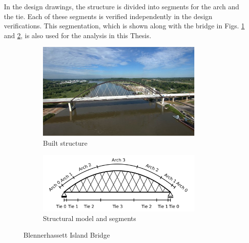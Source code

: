 In the design drawings, the structure is divided into segments for the arch and the tie. Each of these segments is verified independently in the design verifications. This segmentation, which is shown along with the bridge in Figs. \ref{fig:Blennerhassett2_a} and \ref{fig:fig:Blennerhassett2_b}, is also used for the analysis in this Thesis.


\begin{figure}[H]
\centering
\begin{subfigure}{0.5\textwidth}
    \centering
    \includegraphics[width=0.9\textwidth]{overleaf/Pictures/Blennerhassett_2.jpg}
    \caption{Built structure}
    \label{fig:Blennerhassett2_a}
\end{subfigure}%
\begin{subfigure}{.5\textwidth}
    \centering
    \vspace*{0.67cm}
    \includegraphics[width=0.9\textwidth]{illustrations/figures/segments.png}
    \vspace*{0.67cm}
    \caption{Structural model and segments}
    \label{fig:fig:Blennerhassett2_b}
\end{subfigure}
\caption{Blennerhassett Island Bridge}
\label{fig:Blennerhassett2}
\end{figure}

